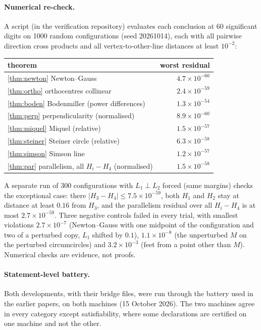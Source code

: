 \documentclass[11pt]{article}
\theoremstyle{definition}
\theoremstyle{remark}
\begin{document}
\paragraph{Numerical re-check.} A script (in the verification repository) evaluates each conclusion at 60
significant digits on 1000 random configurations (seed 20261014), each with all pairwise direction
cross products and all vertex-to-other-line distances at least $10^{-2}$:
\begin{center}\small
\begin{tabular}{lr}
\toprule
theorem & worst residual\\
\midrule
\ref{thm:newton} Newton--Gauss & $4.7\times10^{-60}$\\
\ref{thm:ortho} orthocentres collinear & $2.4\times10^{-59}$\\
\ref{thm:boden} Bodenmiller (power differences) & $1.3\times10^{-54}$\\
\ref{thm:perp} perpendicularity (normalised) & $8.9\times10^{-60}$\\
\ref{thm:miquel} Miquel (relative) & $1.5\times10^{-57}$\\
\ref{thm:steiner} Steiner circle (relative) & $6.3\times10^{-58}$\\
\ref{thm:simson} Simson line & $1.2\times10^{-57}$\\
\ref{thm:par} parallelism, all $H_i-H_4$ (normalised) & $1.5\times10^{-58}$\\
\bottomrule
\end{tabular}
\end{center}
A separate run of 300 configurations with $L_1\perp L_2$ forced (same margins) checks the
exceptional case: there $|H_3-H_4|\le7.5\times10^{-59}$, both $H_1$ and $H_2$ stay at distance at least
$0.16$ from $H_3$, and the parallelism residual over all $H_i-H_4$ is at most $2.7\times10^{-59}$. Three
negative controls failed in every trial, with smallest violations $2.7\times10^{-7}$ (Newton--Gauss
with one midpoint of the configuration and two of a perturbed copy, $L_1$ shifted by $0.1$), $1.1\times10^{-8}$ (the unperturbed $M$ on the
perturbed circumcircles) and $3.2\times10^{-3}$ (feet from a point other than $M$). Numerical checks are
evidence, not proofs.

\paragraph{Statement-level battery.} Both developments, with their bridge files, were run through the
battery used in the earlier papers, on both machines (15 October 2026). The two machines agree in every
category except satisfiability, where some declarations are certified on one machine and not the other.
\end{document}
